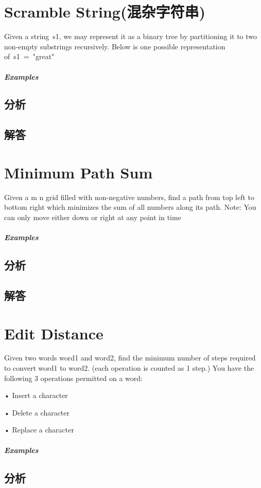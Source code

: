 \documentclass[UTF8,a4paper,12pt]{ctexbook}
\begin{document}
\section{Scramble String(混杂字符串)}
	Given a string s1, we may represent it as a binary tree by partitioning it to two non-empty substrings recursively.
	Below is one possible representation of s1 = "great"
	
	\subparagraph{Examples}
	
	\subsection{分析}
	
	\subsection{解答}
	
\section{Minimum Path Sum}
		Given a m n grid filled with non-negative numbers, find a path from top left to bottom right which
		minimizes the sum of all numbers along its path.
		Note: You can only move either down or right at any point in time
		
	\subparagraph{Examples}
	
	\subsection{分析}
	
	\subsection{解答}
	
\section{Edit Distance}
	Given two words word1 and word2, find the minimum number of steps required to convert word1 to
	word2. (each operation is counted as 1 step.)
	You have the following 3 operations permitted on a word:
	
	• Insert a character
	
	• Delete a character
	
	• Replace a character
	\subparagraph{Examples}
	
	\subsection{分析}
	
\end{document}
